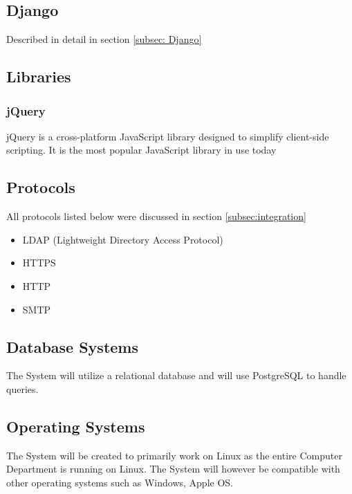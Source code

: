 \documentclass{article}
\begin{document}
		\subsection{Django}
			Described in detail in section \ref{subsec: Django}
			
	\subsection{Libraries}
			\subsubsection{jQuery}
			jQuery is a cross-platform JavaScript library designed to simplify client-side scripting. It is the most popular JavaScript library in use today
	
	\subsection{Protocols}
		All protocols listed below were discussed in section \ref{subsec:integration}
			\begin{itemize}
				\item LDAP (Lightweight Directory Access Protocol)
				\item HTTPS
				\item HTTP
				\item SMTP	
			\end{itemize}
	
	\subsection{Database Systems}
		The System will utilize a relational database and will use PostgreSQL to handle queries.
		
	\subsection{Operating Systems}
		The System will be created to primarily work on Linux as the entire Computer Department is running on Linux. The System will however be compatible with other operating systems such as Windows, Apple OS.
\end{document}
